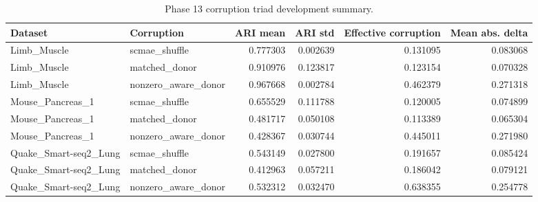 \begin{table}[ht]
\centering
\caption{Phase 13 corruption triad development summary.}
\label{tab:generated-phase13}
\begin{tabular}{llrrrr}
\toprule
Dataset & Corruption & ARI mean & ARI std & Effective corruption & Mean abs. delta \\
\midrule
Limb\_Muscle & scmae\_shuffle & 0.777303 & 0.002639 & 0.131095 & 0.083068 \\
Limb\_Muscle & matched\_donor & 0.910976 & 0.123817 & 0.123154 & 0.070328 \\
Limb\_Muscle & nonzero\_aware\_donor & 0.967668 & 0.002784 & 0.462379 & 0.271318 \\
Mouse\_Pancreas\_1 & scmae\_shuffle & 0.655529 & 0.111788 & 0.120005 & 0.074899 \\
Mouse\_Pancreas\_1 & matched\_donor & 0.481717 & 0.050108 & 0.113389 & 0.065304 \\
Mouse\_Pancreas\_1 & nonzero\_aware\_donor & 0.428367 & 0.030744 & 0.445011 & 0.271980 \\
Quake\_Smart-seq2\_Lung & scmae\_shuffle & 0.543149 & 0.027800 & 0.191657 & 0.085424 \\
Quake\_Smart-seq2\_Lung & matched\_donor & 0.412963 & 0.057211 & 0.186042 & 0.079121 \\
Quake\_Smart-seq2\_Lung & nonzero\_aware\_donor & 0.532312 & 0.032470 & 0.638355 & 0.254778 \\
\bottomrule
\end{tabular}
\end{table}
